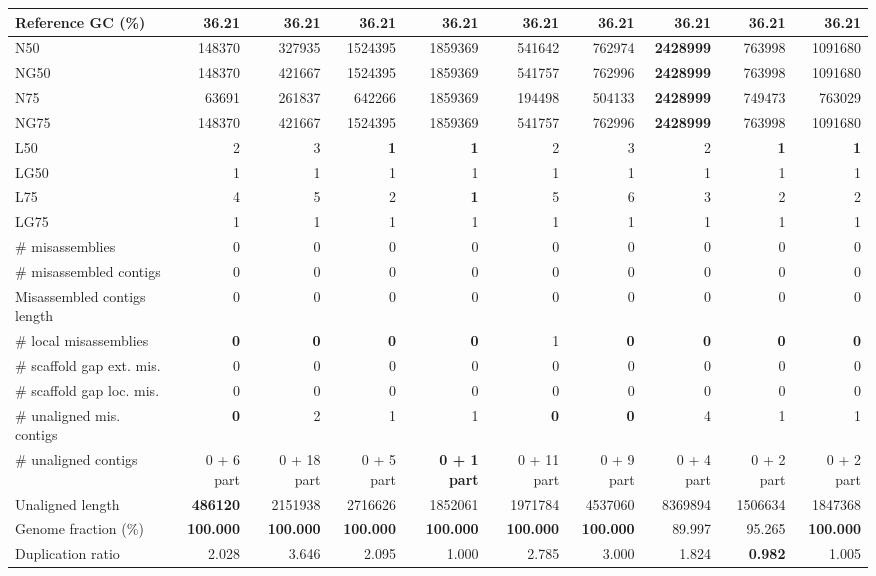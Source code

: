 \documentclass[12pt,a4paper]{article}
\begin{document}
\begin{table}[ht]
\begin{center}
\begin{tabular}{|l*{9}{|r}|}
Reference GC (\%) & 36.21 & 36.21 & 36.21 & 36.21 & 36.21 & 36.21 & 36.21 & 36.21 & 36.21 \\ \hline
N50 & 148370 & 327935 & 1524395 & 1859369 & 541642 & 762974 & {\bf 2428999} & 763998 & 1091680 \\ \hline
NG50 & 148370 & 421667 & 1524395 & 1859369 & 541757 & 762996 & {\bf 2428999} & 763998 & 1091680 \\ \hline
N75 & 63691 & 261837 & 642266 & 1859369 & 194498 & 504133 & {\bf 2428999} & 749473 & 763029 \\ \hline
NG75 & 148370 & 421667 & 1524395 & 1859369 & 541757 & 762996 & {\bf 2428999} & 763998 & 1091680 \\ \hline
L50 & 2 & 3 & {\bf 1} & {\bf 1} & 2 & 3 & 2 & {\bf 1} & {\bf 1} \\ \hline
LG50 & 1 & 1 & 1 & 1 & 1 & 1 & 1 & 1 & 1 \\ \hline
L75 & 4 & 5 & 2 & {\bf 1} & 5 & 6 & 3 & 2 & 2 \\ \hline
LG75 & 1 & 1 & 1 & 1 & 1 & 1 & 1 & 1 & 1 \\ \hline
\# misassemblies & 0 & 0 & 0 & 0 & 0 & 0 & 0 & 0 & 0 \\ \hline
\# misassembled contigs & 0 & 0 & 0 & 0 & 0 & 0 & 0 & 0 & 0 \\ \hline
Misassembled contigs length & 0 & 0 & 0 & 0 & 0 & 0 & 0 & 0 & 0 \\ \hline
\# local misassemblies & {\bf 0} & {\bf 0} & {\bf 0} & {\bf 0} & 1 & {\bf 0} & {\bf 0} & {\bf 0} & {\bf 0} \\ \hline
\# scaffold gap ext. mis. & 0 & 0 & 0 & 0 & 0 & 0 & 0 & 0 & 0 \\ \hline
\# scaffold gap loc. mis. & 0 & 0 & 0 & 0 & 0 & 0 & 0 & 0 & 0 \\ \hline
\# unaligned mis. contigs & {\bf 0} & 2 & 1 & 1 & {\bf 0} & {\bf 0} & 4 & 1 & 1 \\ \hline
\# unaligned contigs & 0 + 6 part & 0 + 18 part & 0 + 5 part & {\bf 0 + 1 part} & 0 + 11 part & 0 + 9 part & 0 + 4 part & 0 + 2 part & 0 + 2 part \\ \hline
Unaligned length & {\bf 486120} & 2151938 & 2716626 & 1852061 & 1971784 & 4537060 & 8369894 & 1506634 & 1847368 \\ \hline
Genome fraction (\%) & {\bf 100.000} & {\bf 100.000} & {\bf 100.000} & {\bf 100.000} & {\bf 100.000} & {\bf 100.000} & 89.997 & 95.265 & {\bf 100.000} \\ \hline
Duplication ratio & 2.028 & 3.646 & 2.095 & 1.000 & 2.785 & 3.000 & 1.824 & {\bf 0.982} & 1.005 \\ \hline

\end{tabular}
\end{center}
\end{table}
\end{document}
